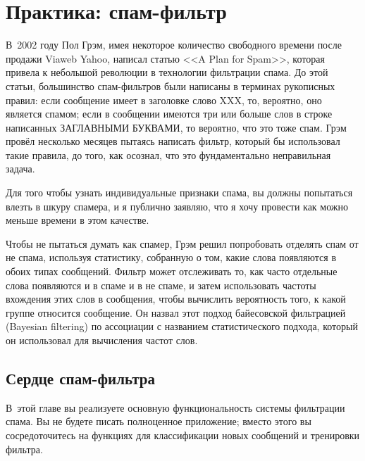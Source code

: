 \chapter{Практика: спам-фильтр}
\label{ch:23}

\thispagestyle{empty}

В~2002 году Пол Грэм, имея некоторое количество свободного времени пос\-ле продажи
Viaweb Yahoo, написал статью <<A Plan for Spam>>, которая привела к небольшой революции в технологии
фильтрации спама.  До этой статьи, большинство спам-фильтров были написаны в терминах
рукописных правил: если сообщение имеет в заголовке слово XXX, то, вероятно, оно является
спамом; если в сообщении имеются три или больше слов в строке написанных ЗАГЛАВНЫМИ
БУКВАМИ, то вероятно, что это тоже спам. Грэм провёл несколько месяцев пытаясь написать
фильтр, который бы использовал такие правила, до того, как осознал, что это фундаментально
неправильная задача.

Для того чтобы узнать индивидуальные признаки спама, вы должны попытаться влезть в шкуру
спамера, и я публично заявляю, что я хочу провести как можно меньше времени в этом
качестве.

Чтобы не пытаться думать как спамер, Грэм решил попробовать отделять спам от не спама,
используя статистику, собранную о том, какие слова появляются в обоих типах сообщений.
Фильтр может отслеживать то, как часто отдельные слова появляются и в спаме и в не спаме,
и затем использовать частоты вхождения этих слов в сообщения, чтобы вычислить вероятность
того, к какой группе относится сообщение.  Он назвал этот подход байесовской фильтрацией
(Bayesian filtering) по ассоциации с названием статистического подхода, который он
использовал для вычисления частот слов.

\section{Сердце спам-фильтра}

В~этой главе вы реализуете основную функциональность системы фильтрации спама.  Вы не
будете писать полноценное приложение; вместо этого вы сосредоточитесь на функциях для
классификации новых сообщений и тренировки фильтра.

